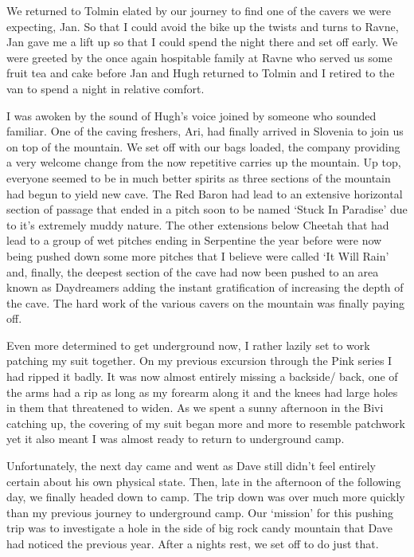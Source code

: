 We returned to Tolmin elated by our journey to find one of the cavers we
were expecting, Jan. So that I could avoid the bike up the twists and
turns to Ravne, Jan gave me a lift up so that I could spend the night
there and set off early. We were greeted by the once again hospitable
family at Ravne who served us some fruit tea and cake before Jan and
Hugh returned to Tolmin and I retired to the van to spend a night in
relative comfort.

I was awoken by the sound of Hugh's voice joined by someone who sounded
familiar. One of the caving freshers, Ari, had finally arrived in
Slovenia to join us on top of the mountain. We set off with our bags
loaded, the company providing a very welcome change from the now
repetitive carries up the mountain. Up top, everyone seemed to be in
much better spirits as three sections of the mountain had begun to yield
new cave. The Red Baron had lead to an extensive horizontal section of
passage that ended in a pitch soon to be named `Stuck In Paradise' due
to it's extremely muddy nature. The other extensions below Cheetah that
had lead to a group of wet pitches ending in Serpentine the year before
were now being pushed down some more pitches that I believe were called
`It Will Rain' and, finally, the deepest section of the cave had now
been pushed to an area known as Daydreamers adding the instant
gratification of increasing the depth of the cave. The hard work of the
various cavers on the mountain was finally paying off.

Even more determined to get underground now, I rather lazily set to work
patching my suit together. On my previous excursion through the Pink
series I had ripped it badly. It was now almost entirely missing a
backside/ back, one of the arms had a rip as long as my forearm along it
and the knees had large holes in them that threatened to widen. As we
spent a sunny afternoon in the Bivi catching up, the covering of my suit
began more and more to resemble patchwork yet it also meant I was almost
ready to return to underground camp.

Unfortunately, the next day came and went as Dave still didn't feel
entirely certain about his own physical state. Then, late in the
afternoon of the following day, we finally headed down to camp. The trip
down was over much more quickly than my previous journey to underground
camp. Our `mission' for this pushing trip was to investigate a hole in
the side of big rock candy mountain that Dave had noticed the previous
year. After a nights rest, we set off to do just that.

